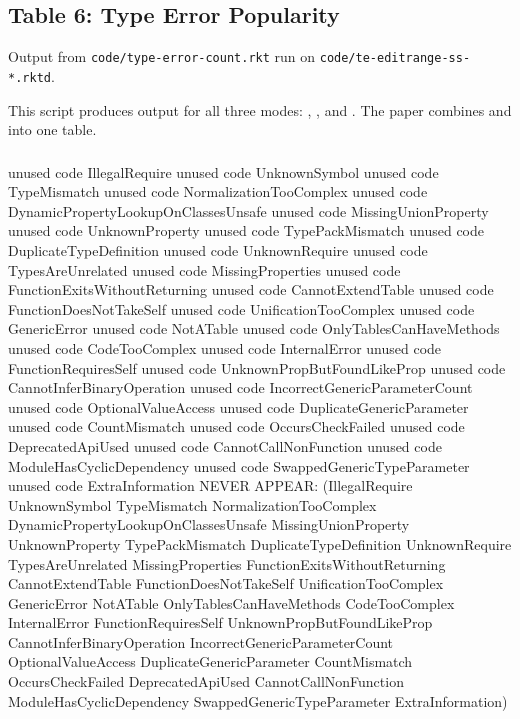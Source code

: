 \documentclass{article}
\begin{document}
\subsection*{Table 6: Type Error Popularity}

Output from \texttt{code/type-error-count.rkt}
run on \texttt{code/te-editrange-ss-*.rktd}.

This script produces output for all three modes: \mnocheck{}, \mnonstrict{}, and \mstrict{}.
The paper combines \mnonstrict{} and \mstrict{} into one table.

\subsubsection*{\mnocheck{}}

unused code IllegalRequire
unused code UnknownSymbol
unused code TypeMismatch
unused code NormalizationTooComplex
unused code DynamicPropertyLookupOnClassesUnsafe
unused code MissingUnionProperty
unused code UnknownProperty
unused code TypePackMismatch
unused code DuplicateTypeDefinition
unused code UnknownRequire
unused code TypesAreUnrelated
unused code MissingProperties
unused code FunctionExitsWithoutReturning
unused code CannotExtendTable
unused code FunctionDoesNotTakeSelf
unused code UnificationTooComplex
unused code GenericError
unused code NotATable
unused code OnlyTablesCanHaveMethods
unused code CodeTooComplex
unused code InternalError
unused code FunctionRequiresSelf
unused code UnknownPropButFoundLikeProp
unused code CannotInferBinaryOperation
unused code IncorrectGenericParameterCount
unused code OptionalValueAccess
unused code DuplicateGenericParameter
unused code CountMismatch
unused code OccursCheckFailed
unused code DeprecatedApiUsed
unused code CannotCallNonFunction
unused code ModuleHasCyclicDependency
unused code SwappedGenericTypeParameter
unused code ExtraInformation
NEVER APPEAR: (IllegalRequire UnknownSymbol TypeMismatch NormalizationTooComplex DynamicPropertyLookupOnClassesUnsafe MissingUnionProperty UnknownProperty TypePackMismatch DuplicateTypeDefinition UnknownRequire TypesAreUnrelated MissingProperties FunctionExitsWithoutReturning CannotExtendTable FunctionDoesNotTakeSelf UnificationTooComplex GenericError NotATable OnlyTablesCanHaveMethods CodeTooComplex InternalError FunctionRequiresSelf UnknownPropButFoundLikeProp CannotInferBinaryOperation IncorrectGenericParameterCount OptionalValueAccess DuplicateGenericParameter CountMismatch OccursCheckFailed DeprecatedApiUsed CannotCallNonFunction ModuleHasCyclicDependency SwappedGenericTypeParameter ExtraInformation)
\end{document}
